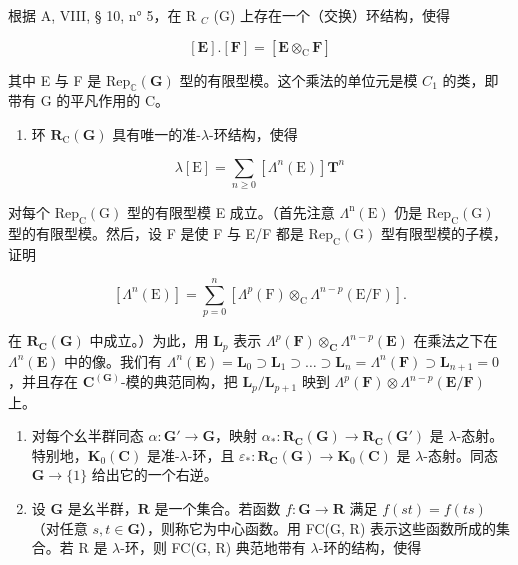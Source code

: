 根据 A, VIII, § 10, n° 5，在 R \(_{C}\) (G) 上存在一个（交换）环结构，使得

\[
[ \mathbf {E} ]. [ \mathbf {F} ] = [ \mathbf {E} \otimes_ {\mathrm{C}} \mathbf {F} ]
\]

其中 E 与 F 是 \(\mathrm{Rep}_{\mathbb{C}}(\mathbf{G})\) 型的有限型模。这个乘法的单位元是模 \(C_1\) 的类，即带有 G 的平凡作用的 C。

\begin{enumerate}
\def\labelenumi{\alph{enumi})}
\tightlist
\item
  环 \(\mathbf{R}_{\mathrm{C}}(\mathbf{G})\) 具有唯一的准-\(\lambda\)-环结构，使得
\end{enumerate}

\[
\lambda [ \mathrm{E} ] = \sum_ {n \geqslant 0} \left[ \Lambda ^ {n} (\mathrm{E}) \right] \mathbf {T} ^ {n}
\]

对每个 \(\mathrm{Rep}_{\mathrm{C}}(\mathrm{G})\) 型的有限型模 E 成立。（首先注意 \(\Lambda^{\mathrm{n}}(\mathrm{E})\) 仍是 \(\mathrm{Rep}_{\mathrm{C}}(\mathrm{G})\) 型的有限型模。然后，设 F 是使 F 与 E/F 都是 \(\mathrm{Rep}_{\mathrm{C}}(\mathrm{G})\) 型有限型模的子模，证明

\[
\left[ \Lambda ^ {n} (\mathrm{E}) \right] = \sum_ {p = 0} ^ {n} \left[ \Lambda ^ {p} (\mathrm{F}) \otimes_ {\mathrm{C}} \Lambda ^ {n - p} (\mathrm{E/F}) \right].
\]

在 \(\mathbf{R}_{\mathbf{C}}(\mathbf{G})\) 中成立。）为此，用 \(\mathbf{L}_p\) 表示 \(\Lambda^p(\mathbf{F}) \otimes_{\mathbf{C}} \Lambda^{n-p}(\mathbf{E})\) 在乘法之下在 \(\Lambda^n(\mathbf{E})\) 中的像。我们有 \(\Lambda^n(\mathbf{E}) = \mathbf{L}_0 \supset \mathbf{L}_1 \supset \ldots \supset \mathbf{L}_n = \Lambda^n(\mathbf{F}) \supset \mathbf{L}_{n+1} = 0\)，并且存在 \(\mathbf{C}^{(\mathbf{G})}\)-模的典范同构，把 \(\mathbf{L}_p / \mathbf{L}_{p+1}\) 映到 \(\Lambda^p(\mathbf{F}) \otimes \Lambda^{n-p}(\mathbf{E}/\mathbf{F})\) 上。

\begin{enumerate}
\def\labelenumi{\alph{enumi})}
\setcounter{enumi}{1}
\item
  对每个幺半群同态 \(\alpha: \mathbf{G}' \to \mathbf{G}\)，映射 \(\alpha_*: \mathbf{R}_{\mathbf{C}}(\mathbf{G}) \to \mathbf{R}_{\mathbf{C}}(\mathbf{G}')\) 是 \(\lambda\)-态射。特别地，\(\mathbf{K}_0(\mathbf{C})\) 是准-\(\lambda\)-环，且 \(\varepsilon_*: \mathbf{R}_{\mathbf{C}}(\mathbf{G}) \to \mathbf{K}_0(\mathbf{C})\) 是 \(\lambda\)-态射。同态 \(\mathbf{G} \to \{1\}\) 给出它的一个右逆。
\item
  设 \(\mathbf{G}\) 是幺半群，\(\mathbf{R}\) 是一个集合。若函数 \(f: \mathbf{G} \to \mathbf{R}\) 满足 \(f(st) = f(ts)\)（对任意 \(s, t \in \mathbf{G}\)），则称它为中心函数。用 FC(G, R) 表示这些函数所成的集合。若 R 是 \(\lambda\)-环，则 FC(G, R) 典范地带有 \(\lambda\)-环的结构，使得
\end{enumerate}

